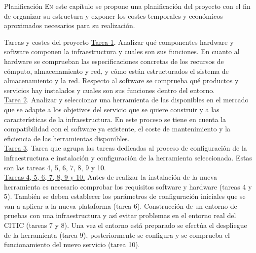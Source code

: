 \begin{chapter}{Planificación}
\label{chap:planificacionProyecto}
\lettrine{E}{n} este capítulo se propone una planificación del proyecto con el fin de organizar su estructura y exponer los costes temporales y económicos aproximados necesarios para su realización.
\begin{section}{Tareas y costes del proyecto}
\underline{Tarea 1}. Analizar qué componentes hardware y software componen la infraestructura y cuales son sus funciones. En cuanto al hardware se comprueban las especificaciones concretas de los recursos de cómputo, almacenamiento y red, y cómo están estructurados el sistema de almacenamiento y la red. Respecto al software se comprueba qué productos y servicios hay instalados y cuales son sus funciones dentro del entorno.\\
\underline{Tarea 2}. Analizar y seleccionar una herramienta de las disponibles en el mercado que se adapte a los objetivos del servicio que se quiere construir y a las características de la infraestructura. En este proceso se tiene en cuenta la compatibilidad con el software ya existente, el coste de mantenimiento y la eficiencia de las herramientas disponibles.\\
\underline{Tarea 3}. Tarea que agrupa las tareas dedicadas al proceso de configuración de la infraestructura e instalación y configuración de la herramienta seleccionada. Estas son las tareas 4, 5, 6, 7, 8, 9 y 10.\\
\underline{Tareas 4, 5, 6, 7, 8, 9 y 10.} Antes de realizar la instalación de la nueva herramienta es necesario comprobar los requisitos software y hardware (tareas 4 y 5). También se deben establecer los parámetros de configuración iniciales que se van a aplicar a la nueva plataforma (tarea 6). Construcción de un entorno de pruebas con una infraestructura y así evitar problemas en el entorno real del CITIC (tareas 7 y 8). Una vez el entorno está preparado se efectúa el despliegue de la herramienta (tarea 9), posteriormente se configura y se comprueba el funcionamiento del nuevo servicio (tarea 10).\\

\end{section}
\end{chapter}
